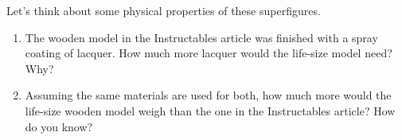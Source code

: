 \documentclass[handout,nooutcomes,noauthor,hints]{ximera}
\begin{document}
\begin{question}
  Let's think about some physical properties of these superfigures.
  \begin{enumerate}
 \item The wooden model in the Instructables article was finished with
   a spray coating of lacquer.  How much more lacquer would the life-size model need? Why?
 \item Assuming the same materials are used for both, how much more
   would the life-size wooden model weigh than the one in the
   Instructables article?  How do you know?
\end{enumerate}
\end{question}





 
 
\end{document}
